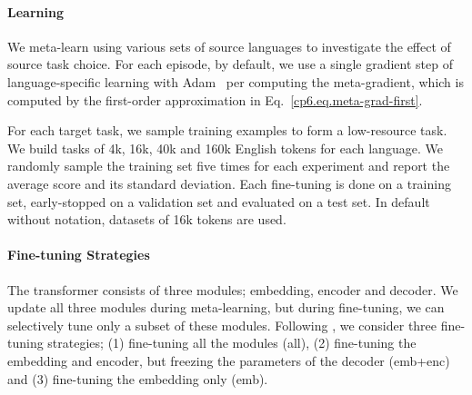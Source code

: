 \paragraph{Learning}
We meta-learn using various sets of source languages to investigate the effect of source task choice. For each episode, by default, we use a single gradient step of language-specific learning with Adam~\citep{kingma2014adam} per computing the meta-gradient, which is computed by the first-order approximation in Eq.~\eqref{cp6.eq.meta-grad-first}. 

For each target task, we sample training examples to form a low-resource task. We build tasks of 4k, 16k, 40k and 160k English tokens for each language. We randomly sample the training set five times for each experiment and report the average score and its standard deviation. Each fine-tuning is done on a training set, early-stopped on a validation set and evaluated on a test set. In default without notation, datasets of 16k tokens are used.








\paragraph{Fine-tuning Strategies}

The transformer consists of three modules; embedding, encoder and decoder. We update all three modules during meta-learning, but during fine-tuning, we can selectively tune only a subset of these modules. Following \citep{zoph2016transfer}, we consider three fine-tuning strategies; (1) fine-tuning all the modules (all), (2) fine-tuning the embedding and encoder, but freezing the parameters of the decoder (emb+enc) and (3) fine-tuning the embedding only (emb). %




